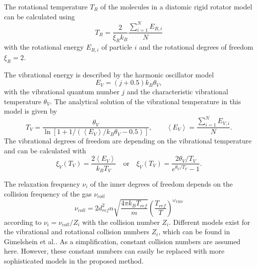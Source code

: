 \documentclass[aip,pof,amsmath,amssymb,preprint]{revtex4-1}
\begin{document}

The rotational temperature $T_R$ of the molecules in a diatomic rigid rotator model can be calculated using 
\begin{equation}
T_R=\frac{2}{\xi_Rk_B}\frac{\sum_{i=1}^N E_{R,i}}{N}
\end{equation}
with the rotational energy $E_{R,i}$ of particle $i$ and the rotational degrees of freedom $\xi_R=2$.

The vibrational energy is described by the harmonic oscillator model
\begin{equation}
E_V=(j+0.5)k_B\theta_V,
\end{equation}
with the vibrational quantum number $j$ and the characteristic vibrational temperature $\theta_V$.
The analytical solution of the vibrational temperature in this
model is given by 
\begin{equation}
T_V=\frac{\theta_V}{\ln\left[1+1/(\left<E_V\right>/k_B\theta_V -0.5)\right]}, \quad\quad 
\left<E_V\right>=\frac{\sum_{i=1}^N E_{V,i}}{N}.
\end{equation}
The vibrational degrees of freedom are depending on the vibrational temperature and can be calculated with 
\begin{equation}
\xi_V(T_V)=\frac{2\left<E_V\right>}{k_B T_V}\quad\text{or}\quad \xi_V(T_V)=\frac{2\theta_V/T_V}{e^{\theta_V/T_V}-1}.
\end{equation}

The relaxation frequency $\nu_i$ of the inner degrees of freedom depends on the collision frequency of the gas $\nu_{coll}$
\begin{equation}
\nu_{coll}=2d_{ref}^2n \sqrt{\frac{4\pi k_B T_{ref}}{m}}\left(\frac{T_{ref}}{T}\right)^{\omega_{VHS}}
\end{equation} 
according to $\nu_i=\nu_{coll}/Z_i$ with the collision number $Z_i$. Different models exist for the vibrational and rotational collision numbers $Z_i$,
which can be found in Gimelshein et al.\cite{Gimelshein2002,Haas1994}. As a simplification, constant collision numbers are assumed here. However, these constant numbers can easily be replaced with 
more sophisticated models in the proposed method.
\end{document}
